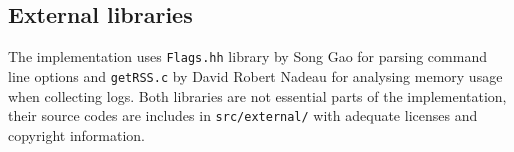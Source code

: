 \subsection{External libraries}

The implementation uses \texttt{Flags.hh} library by Song Gao for parsing command line options and \texttt{getRSS.c} by David Robert Nadeau for analysing memory usage when collecting logs. Both libraries are not essential parts of the implementation, their source codes are includes in \texttt{src/external/} with adequate licenses and copyright information. 


